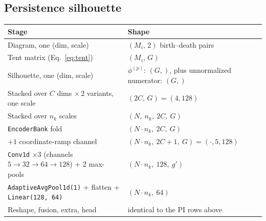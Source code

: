 \documentclass[11pt]{article}
\newcommand{\Nb}{N}
\newcommand{\nk}{n_k}
\begin{document}
\subsection{Persistence silhouette}
\begin{center}
\begin{tabular}{@{}p{6.6cm}p{8.6cm}@{}}
\toprule
Stage & Shape \\
\midrule
Diagram, one (dim, scale) & $(M_i,\,2)$ birth--death pairs \\
Tent matrix (Eq.~\ref{eq:tent}) & $(M_i,\,G)$ \\
Silhouette, one (dim, scale) & $\phi^{(p)}$: $(G,)$, plus unnormalized numerator: $(G,)$ \\
Stacked over $C$ dims $\times\,2$ variants, one scale & $(2C,\,G) = (4,128)$ \\
Stacked over $\nk$ scales & $(\Nb,\ \nk,\ 2C,\ G)$ \\
\texttt{EncoderBank} fold & $(\Nb\!\cdot\!\nk,\ 2C,\ G)$ \\
$+1$ coordinate-ramp channel & $(\Nb\!\cdot\!\nk,\ 2C{+}1,\ G) = (\cdot,5,128)$ \\
\texttt{Conv1d} $\times3$ (channels $5\to32\to64\to128$) + 2 max-pools & $(\Nb\!\cdot\!\nk,\ 128,\ g')$ \\
\texttt{AdaptiveAvgPool1d(1)} + flatten + \texttt{Linear(128,\,64)} & $(\Nb\!\cdot\!\nk,\ 64)$ \\
Reshape, fusion, extra, head & identical to the PI rows above \\
\bottomrule
\end{tabular}
\end{center}
\end{document}
